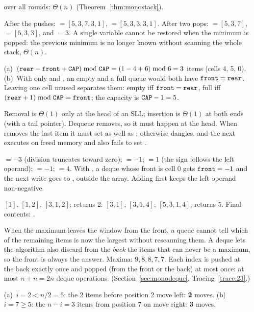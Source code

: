 \begin{questions}
  over all rounds: $\Theta(n)$ (Theorem~\ref{thm:monostack}).
\item After the pushes:  $=[5,3,7,3,1]$,  $=[5,3,3,3,1]$. After two pops:
   $=[5,3,7]$,  $=[5,3,3]$, and  $=3$. A single variable
  cannot be restored when the minimum is popped: the previous minimum is no longer known
  without scanning the whole stack, $\Theta(n)$.
\item (a)~$(\texttt{rear}-\texttt{front}+\texttt{CAP})\bmod\texttt{CAP}=(1-4+6)\bmod6=3$ items (cells 4,
  5, 0). (b)~With only  and , an empty and a full queue would both
  have $\texttt{front}=\texttt{rear}$. Leaving one cell unused separates them: empty iff
  $\texttt{front}=\texttt{rear}$, full iff $(\texttt{rear}+1)\bmod\texttt{CAP}=\texttt{front}$; the capacity
  is $\texttt{CAP}-1=5$.
\item Removal is $\Theta(1)$ only at the head of an SLL; insertion is $\Theta(1)$ at
  both ends (with a tail pointer). Dequeue removes, so it must happen at the head.
  When  removes the last item it must set  as well as
  ; otherwise  dangles, and the next  executes
   on freed memory and also fails to set .
\item {} $=-3$ (division truncates toward zero);  $=-1$;  $=1$
  (the sign follows the left operand);  $=-1$;  $=4$. With
  , a deque whose front is cell 0 gets $\texttt{front}=-1$ and
  the next write goes to , outside the array. Adding  first keeps
  the left operand non-negative.
\item $[1]$, $[1,2]$, $[3,1,2]$;  returns 2: $[3,1]$; $[3,1,4]$;
  $[5,3,1,4]$;  returns 5. Final contents: .
\item When the maximum leaves the window from the front, a queue cannot tell which of the
  remaining items is now the largest without rescanning them. A deque lets the algorithm
  also discard from the \emph{back} the items that can never be a maximum, so the front is
  always the answer. Maxima: $9,8,8,7,7$. Each index is pushed at the back exactly once
  and popped (from the front or the back) at most once: at most $n+n=2n$ deque
  operations. (Section~\ref{sec:monodeque}, Tracing~\ref{trace:23}.)
\item (a)~$i=2<n/2=5$: the 2 items before position 2 move left: \textbf{2} moves.
  (b)~$i=7\ge5$: the $n-i=3$ items from position 7 on move right: \textbf{3} moves.

\end{questions}
